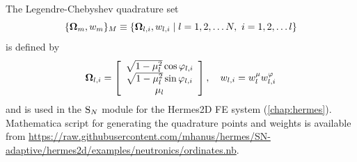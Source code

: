 The Legendre-Chebyshev quadrature set 
$$
	\{\mathbf{\Omega}_m,w_m\}_{M} \equiv \{\mathbf{\Omega}_{l,i},w_{l,i}\mid l = 1,2,\ldots N,\ i = 1,2,\ldots l\}
$$ 
is defined by
\begin{equation}\label{eq:LCNset}
		\mathbf{\Omega}_{l,i} = 
		\left[\begin{array}{c}
		\sqrt{1-\mu_l^2}\cos \varphi_{l,i} \\
		\sqrt{1-\mu_l^2}\sin \varphi_{l,i} \\
		\mu_l
	\end{array}\right],\quad
	w_{l,i} = w_{l}^\mu w_{l,i}^\varphi
\end{equation}
and is used in the $\text{S}_{N}$ module for the Hermes2D FE system (\cref{chap:hermes}). Mathematica script for generating the
quadrature points and weights is available from
\url{https://raw.githubusercontent.com/mhanus/hermes/SN-adaptive/hermes2d/examples/neutronics/ordinates.nb}.


